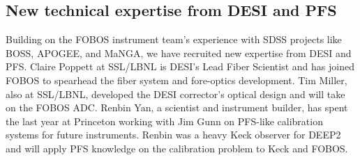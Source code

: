 \subsection{New technical expertise from DESI and PFS} Building on the FOBOS instrument team's experience with SDSS projects like BOSS, APOGEE, and MaNGA, we have recruited new expertise from DESI and PFS.  Claire Poppett at SSL/LBNL is DESI's Lead Fiber Scientist and has joined FOBOS to spearhead the fiber system and fore-optics development.  Tim Miller, also at SSL/LBNL, developed the DESI corrector's optical design and will take on the FOBOS ADC.  Renbin Yan, a scientist and instrument builder, has spent the last year at Princeton working with Jim Gunn on PFS-like calibration systems for future instruments.  Renbin was a heavy Keck observer for DEEP2 and will apply PFS knowledge on the calibration problem to Keck and FOBOS.

